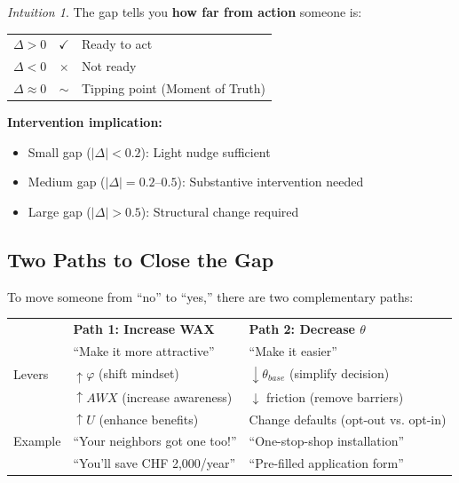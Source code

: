 \documentclass[11pt,a4paper]{book}
\theoremstyle{definition}
\theoremstyle{remark}
\newtheorem*{intuition}{Intuition}
\begin{document}
\begin{intuition}
The gap tells you \textbf{how far from action} someone is:

\begin{center}
\begin{tabular}{rcp{6cm}}
$\Delta > 0$ & $\checkmark$ & Ready to act\\
$\Delta < 0$ & $\times$ & Not ready\\
$\Delta \approx 0$ & $\sim$ & Tipping point (Moment of Truth)\\
\end{tabular}
\end{center}

\textbf{Intervention implication:}
\begin{itemize}
\item Small gap ($|\Delta| < 0.2$): Light nudge sufficient
\item Medium gap ($|\Delta| = 0.2$--$0.5$): Substantive intervention needed
\item Large gap ($|\Delta| > 0.5$): Structural change required
\end{itemize}
\end{intuition}

\subsection{Two Paths to Close the Gap}

To move someone from ``no'' to ``yes,'' there are two complementary paths:

\begin{center}
\begin{tabular}{lp{5cm}p{5cm}}
\toprule
& \textbf{Path 1: Increase WAX} & \textbf{Path 2: Decrease $\theta$}\\
& ``Make it more attractive'' & ``Make it easier''\\
\midrule
Levers & $\uparrow \varphi$ (shift mindset) & $\downarrow \theta_{base}$ (simplify decision)\\
& $\uparrow AWX$ (increase awareness) & $\downarrow$ friction (remove barriers)\\
& $\uparrow U$ (enhance benefits) & Change defaults (opt-out vs. opt-in)\\
\midrule
Example & ``Your neighbors got one too!'' & ``One-stop-shop installation''\\
& ``You'll save CHF 2,000/year'' & ``Pre-filled application form''\\
\bottomrule
\end{tabular}
\end{center}
\end{document}
